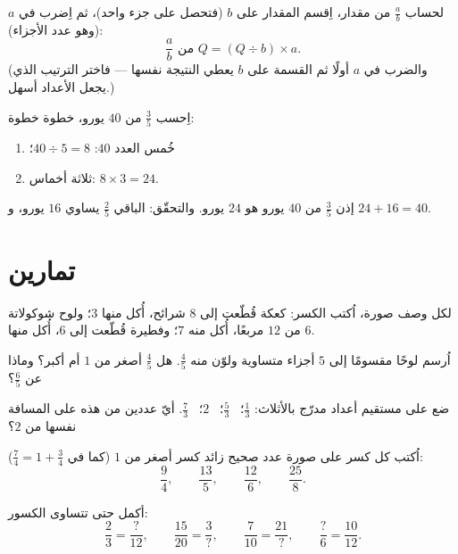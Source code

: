\begin{method}\label{met:g6:fractions:ofquantity}
لحساب $\frac ab$ من مقدار، اِقسم المقدار على $b$ (فتحصل على جزء
واحد)، ثم اِضرب في $a$ (وهو عدد الأجزاء):
\[
\frac ab \text{ من } Q = (Q \div b) \times a .
\]
(والضرب في $a$ أولًا ثم القسمة على $b$ يعطي النتيجة نفسها ---
فاختر الترتيب الذي يجعل الأعداد أسهل.)
\end{method}

\begin{example}\label{ex:g6:fractions:ofquantity}
اِحسب $\frac35$ من $40$ يورو، خطوة خطوة:
\begin{enumerate}
  \item خُمس العدد $40$: $40 \div 5 = 8$؛
  \item ثلاثة أخماس: $8 \times 3 = 24$.
\end{enumerate}
إذن $\frac35$ من $40$ يورو هو $24$ يورو. والتحقّق: الباقي
$\frac25$ يساوي $16$ يورو، و $24 + 16 = 40$.
\end{example}

\section{تمارين}

\begin{exercise}[$\star$]\label{exo:g6:fractions:1}
لكل وصف صورة، اُكتب الكسر: كعكة قُطّعت إلى $8$
شرائح، أُكل منها $3$؛ ولوح شوكولاتة من $12$ مربعًا، أُكل منه $7$؛ وفطيرة
قُطّعت إلى $6$، أُكل منها $6$.
\end{exercise}

\begin{exercise}[$\star$]\label{exo:g6:fractions:2}
اُرسم لوحًا مقسومًا إلى $5$ أجزاء متساوية ولوّن منه $\frac45$. هل
$\frac45$ أصغر من $1$ أم أكبر؟ وماذا عن $\frac65$؟
\end{exercise}

\begin{exercise}[$\star$]\label{exo:g6:fractions:3}
ضع على مستقيم أعداد مدرّج بالأثلاث: $\frac13$؛ \ $\frac53$؛
\ $2$؛ \ $\frac73$. أيّ عددين من هذه على المسافة نفسها من
$2$؟
\end{exercise}

\begin{exercise}[$\star$]\label{exo:g6:fractions:4}
اُكتب كل كسر على صورة عدد صحيح زائد كسر أصغر من $1$
(كما في $\frac74 = 1 + \frac34$):
\[
\frac{9}{4}, \qquad \frac{13}{5}, \qquad \frac{12}{6}, \qquad
\frac{25}{8} .
\]
\end{exercise}

\begin{exercise}[$\star$]\label{exo:g6:fractions:5}
أكمل حتى تتساوى الكسور:
\[
\frac{2}{3} = \frac{?}{12}, \qquad
\frac{15}{20} = \frac{3}{?}, \qquad
\frac{7}{10} = \frac{21}{?}, \qquad
\frac{?}{6} = \frac{10}{12}.
\]
\end{exercise}

